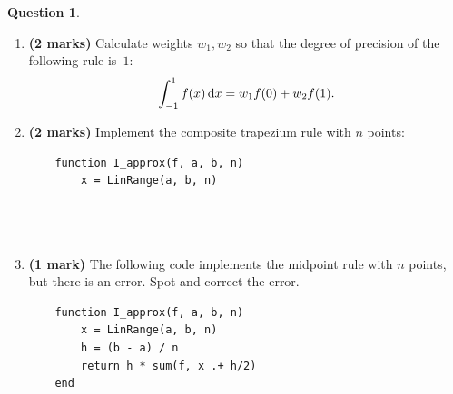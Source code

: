 \documentclass[10pt]{article}
\theoremstyle{definition}
\newtheorem{question}{Question}
\theoremstyle{remark}
\theoremstyle{plain}%
\begin{document}
\begin{question}
\begin{enumerate}
        \item
            \textbf{(2 marks)}
            Calculate weights $w_1,w_2$ so that the degree of precision of the following rule is~$1$:
            \[
                \int_{-1}^1 f(x) \, \mathrm d x = w_1 f(0) + w_2 f(1).
            \]

        \item
            \textbf{(2 marks)}
            Implement the composite trapezium rule with $n$ points:
            \begin{verbatim}
    function I_approx(f, a, b, n)
        x = LinRange(a, b, n)




            \end{verbatim}

        \item
            \textbf{(1 mark)}
            The following code implements the midpoint rule with $n$ points, but there is an error.
            Spot and correct the error.
            \begin{verbatim}
    function I_approx(f, a, b, n)
        x = LinRange(a, b, n)
        h = (b - a) / n
        return h * sum(f, x .+ h/2)
    end
            \end{verbatim}
    \end{enumerate}
\end{question}
\end{document}
